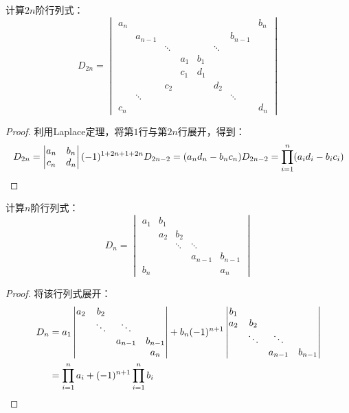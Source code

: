 \begin{theorem}
	计算$2n$阶行列式：
	\begin{equation*}
		D_{2n}=
		\begin{vmatrix}
			a_n & & & & & & & b_n \\
			& a_{n-1} & & & & & b_{n-1}& \\
			& & \ddots & & & \ddots & & \\ 
			& & & a_1 & b_1 & & & \\ 
			& & & c_1 & d_1 & & & \\ 
			& & c_2 & & & d_2 & & \\ 
			& \ddots & & & & & \ddots & \\ 
			c_n & & & & & & & d_n
		\end{vmatrix}
	\end{equation*}
\end{theorem}
\begin{proof}
	利用Laplace定理，将第$1$行与第$2n$行展开，得到：
	\begin{equation*}
		D_{2n}=
		\begin{vmatrix}
			a_n & b_n \\
			c_n & d_n
		\end{vmatrix}
		(-1)^{1+2n+1+2n}D_{2n-2}
		=(a_nd_n-b_nc_n)D_{2n-2}=\prod_{i=1}^n(a_id_i-b_ic_i)\qedhere
	\end{equation*}
\end{proof}

\begin{theorem}
	计算$n$阶行列式：
	\begin{equation*}
		D_{n}=
		\begin{vmatrix}
			a_1 & b_1 & & & \\
			& a_2 & b_2 & & \\
			& & \ddots & \ddots & \\
			& & & a_{n-1} & b_{n-1} \\
			b_n & & & & a_n
		\end{vmatrix}
	\end{equation*}
\end{theorem}
\begin{proof}
	将该行列式展开：
	\begin{align*}
		D_n
		&=a_1
		\begin{vmatrix}
			a_2 & b_2 & & \\
			& \ddots & \ddots & \\
			& & a_{n-1} & b_{n-1} \\
		 	& & & a_n
		\end{vmatrix}
		+b_n(-1)^{n+1}
		\begin{vmatrix}
			b_1 & & & \\
			a_2 & b_2 & & \\
			& \ddots & \ddots & \\
			& & a_{n-1} & b_{n-1}
		\end{vmatrix} \\
		&=\prod_{i=1}^na_i+(-1)^{n+1}\prod_{i=1}^nb_i\qedhere
	\end{align*}
\end{proof}

